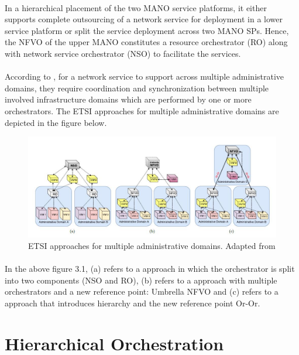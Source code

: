 \paragraph{}In a hierarchical placement of the two MANO service platforms, it either supports complete outsourcing of a network service for deployment in a lower service platform or split the service deployment across two MANO SPs. Hence, the NFVO of the upper MANO constitutes a resource orchestrator (RO) along with network service orchestrator (NSO) to facilitate the services.



\paragraph{}According to \cite{de2018network}, for a network service to support across multiple administrative domains, they require coordination and synchronization between multiple involved infrastructure domains which are performed by one or more orchestrators. The ETSI approaches for multiple administrative domains are depicted in the figure below.

\begin{figure}
	\centering
	\includegraphics[width=0.8\linewidth]{"figures/ETSI approaches"}
	\caption{ETSI approaches for multiple administrative domains. Adapted from \cite{de2018network}}
	\label{fig:etsi-approaches}
\end{figure}


\paragraph{}In the above figure 3.1, (a) refers to a approach in which the orchestrator is split into two components (NSO and RO), (b) refers to a approach with multiple orchestrators and a new reference point: Umbrella NFVO and (c) refers to a approach that introduces hierarchy and the new reference point Or-Or.

\section{Hierarchical Orchestration}



